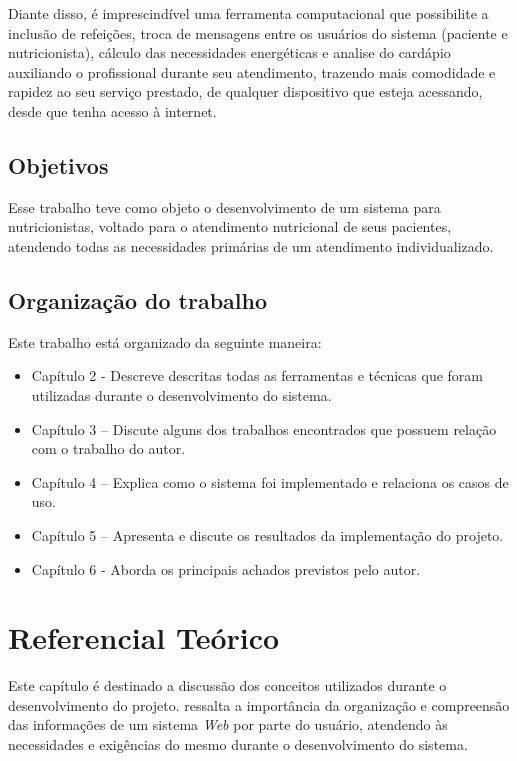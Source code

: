 \documentclass[
	12pt,				%
    oneside,			%
	a4paper,			%
	english,			%
	french,				%
	spanish,			%
	brazil,				%
	]{abntex2}
\begin{document}
Diante disso, é imprescindível uma ferramenta computacional que possibilite a inclusão de refeições, troca de mensagens entre
os usuários do sistema (paciente e nutricionista), 
cálculo das necessidades energéticas e analise do
cardápio auxiliando o profissional durante seu atendimento, trazendo mais
comodidade e rapidez ao seu serviço prestado, de qualquer dispositivo que esteja acessando, desde
que tenha acesso à internet.

\section{Objetivos}

Esse trabalho teve como objeto o desenvolvimento de um sistema para
nutricionistas, voltado para o atendimento nutricional de seus pacientes, atendendo
todas as necessidades primárias de um atendimento individualizado.

\section{Organização do trabalho}
Este trabalho está organizado da seguinte maneira:

 \begin{itemize}

	\item Capítulo 2 - Descreve descritas todas as ferramentas e técnicas que foram utilizadas durante o desenvolvimento do sistema.
	\item Capítulo 3 – Discute alguns dos trabalhos encontrados que possuem relação com o trabalho do autor.
	\item Capítulo 4 – Explica como o sistema foi implementado e relaciona os casos de uso.
	\item Capítulo 5 – Apresenta e discute os resultados da implementação do projeto.
	\item Capítulo 6 - Aborda os principais achados previstos pelo autor.

\end{itemize}

\chapter{Referencial Teórico}

Este capítulo é destinado a discussão dos conceitos utilizados durante o desenvolvimento do projeto.  ressalta a importância da organização e compreensão das informações de um sistema \textit{Web} por parte do usuário, atendendo às necessidades e exigências do mesmo durante o desenvolvimento do sistema.
\end{document}
